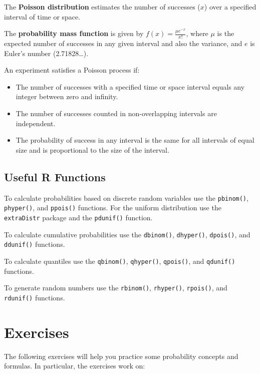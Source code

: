 \documentclass[
  letterpaper,
  DIV=11,
  numbers=noendperiod]{scrreprt}
\begin{document}
The \textbf{Poisson distribution} estimates the number of successes
(\(x\)) over a specified interval of time or space.

The \textbf{probability mass function} is given by
\(f(x)= \frac {\mu e^{-x}}{x!}\), where \(\mu\) is the expected number
of successes in any given interval and also the variance, and \(e\) is
Euler's number (2.71828\ldots).

An experiment satisfies a Poisson process if:

\begin{itemize}
\item
  The number of successes with a specified time or space interval equals
  any integer between zero and infinity.
\item
  The number of successes counted in non-overlapping intervals are
  independent.
\item
  The probability of success in any interval is the same for all
  intervals of equal size and is proportional to the size of the
  interval.
\end{itemize}

\hypertarget{useful-r-functions-8}{%
\subsection*{Useful R Functions}\label{useful-r-functions-8}}

To calculate probabilities based on discrete random variables use the
\texttt{pbinom()}, \texttt{phyper()}, and \texttt{ppois()} functions.
For the uniform distribution use the \texttt{extraDistr} package and the
\texttt{pdunif()} function.

To calculate cumulative probabilities use the \texttt{dbinom()},
\texttt{dhyper()}, \texttt{dpois()}, and \texttt{ddunif()} functions.

To calculate quantiles use the \texttt{qbinom()}, \texttt{qhyper()},
\texttt{qpois()}, and \texttt{qdunif()} functions.

To generate random numbers use the \texttt{rbinom()}, \texttt{rhyper()},
\texttt{rpois()}, and \texttt{rdunif()} functions.

\hypertarget{exercises-8}{%
\section{Exercises}\label{exercises-8}}

The following exercises will help you practice some probability concepts
and formulas. In particular, the exercises work on:
\end{document}
